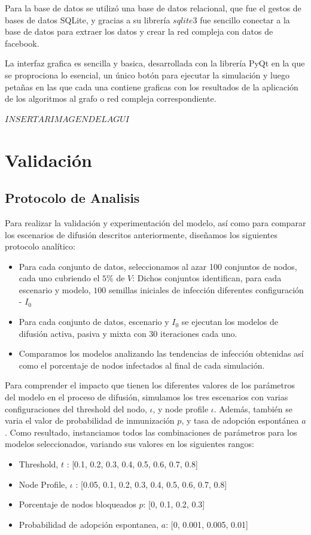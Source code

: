 \documentclass{article}
\begin{document}
Para la base de datos se utilizó una base de datos relacional, que fue el gestos de bases de datos SQLite, y gracias a su librería $sqlite3$ fue sencillo conectar a la base de datos para extraer los datos y crear la red compleja con datos de facebook.

La interfaz grafica es sencilla y basica, desarrollada con la librería PyQt en la que se proprociona lo esencial, un único botón para ejecutar la simulación y luego petañas en las que cada una contiene graficas con los resultados de la aplicación de los algoritmos al grafo o red compleja correspondiente. 


$INSERTAR IMAGEN DE LA GUI$

\section{Validación}
\subsection{Protocolo de Analisis}
Para realizar la validación y experimentación del modelo, así como para comparar los escenarios de difusión descritos anteriormente, diseñamos los siguientes protocolo analítico:
\begin{itemize}
\item Para cada conjunto de datos, seleccionamos al azar 100 conjuntos de nodos, cada uno cubriendo el $5\%$ de $V$: Dichos conjuntos identifican, para cada escenario y modelo, $100$ semillas iniciales de infección diferentes configuración - $I_0$
\item Para cada conjunto de datos, escenario y $I_0$ se ejecutan los modelos de difusión activa, pasiva y mixta con 30 iteraciones cada uno.
\item Comparamos los modelos analizando las tendencias de infección obtenidas así como el porcentaje de nodos infectados al final de cada simulación.
\end{itemize}
Para comprender el impacto que tienen los diferentes valores de los parámetros del modelo en el proceso de difusión, simulamos los tres escenarios con varias configuraciones del threshold del nodo, $\iota$, y node profile $\iota$. Además, también se varia el valor de probabilidad de inmunización $p$, y tasa de adopción espontánea $a$. Como resultado, instanciamos todos las combinaciones de parámetros para los modelos seleccionados, variando sus valores en los siguientes rangos:

\begin{itemize}
\item Threshold, $t$ : [0.1, 0.2, 0.3, 0.4, 0.5, 0.6, 0.7, 0.8]
\item Node Profile, $\iota$ : [0.05, 0.1, 0.2, 0.3, 0.4, 0.5, 0.6, 0.7, 0.8]
\item Porcentaje de nodos bloqueados $p$: [0, 0.1, 0.2, 0.3]
\item Probabilidad de adopción espontanea, $a$: [0, 0.001, 0.005, 0.01]
\end{itemize}
\end{document}
